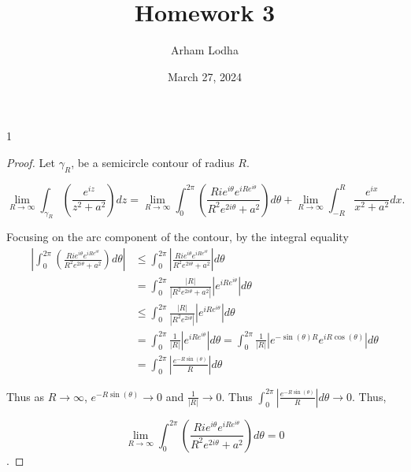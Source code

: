\documentclass{article}
\newcommand{\abs}[1]{\left\lvert #1\right\rvert}
\newcommand*{\lm}[1]{\lim_{#1 \to \infty}}
\begin{document}
\title{Homework 3}
\author{Arham Lodha}%
\date{March 27, 2024}%
\maketitle

\begin{PROB}{1}\label{Problem 1.}
\end{PROB}
\begin{proof}
    Let $\gamma_R$, be a semicircle contour of radius $R$. 
    
    \begin{equation}
        \lm{R} \int_{\gamma_R} \left(\frac{e^{iz}}{z^2 + a^2}\right) dz 
        = \lm{R} \int_{0}^{2 \pi} \left(\frac{Ri e^{i \theta} e^{i Re^{i \theta}}}{R^2 e^{2i \theta} + a^2}\right) d \theta + \lm{R} \int_{-R}^{R} \frac{e^{ix}}{x^2 + a^2} dx.
    \end{equation}

    Focusing on the arc component of the contour, by the integral equality
    \begin{align*}
        \abs{\int_{0}^{2 \pi} \left(\frac{Ri e^{i \theta} e^{i Re^{i \theta}}}{R^2 e^{2i \theta} + a^2}\right) d \theta} 
        &\leq \int_{0}^{2 \pi} \abs{\frac{Ri e^{i \theta} e^{i Re^{i \theta}}}{R^2 e^{2i \theta} + a^2}} d \theta \\
        &= \int_{0}^{2 \pi} \frac{\abs{R}}{\abs{R^2e^{2 i \theta} + a^2}} \abs{e^{i Re^{i \theta}}} d \theta \\
        &\leq \int_{0}^{2 \pi} \frac{\abs{R}}{\abs{R^2e^{2 i \theta}}} \abs{e^{i Re^{i \theta}}} d \theta \\
        &= \int_{0}^{2 \pi} \frac{1}{\abs{R}}\abs{e^{iRe^{i \theta}}} d \theta = \int_{0}^{2 \pi}\frac{1}{\abs{R}}\abs{e^{-\sin(\theta)R} e^{i R \cos(\theta)}} d \theta\\
        &= \int_{0}^{2 \pi} \abs{\frac{e^{-R \sin(\theta)}}{R}} d \theta
    \end{align*}

    Thus as $R \to \infty$, $e^{-R \sin(\theta)} \to 0$ and $\frac{1}{|R|} \to 0$. Thus $\int_{0}^{2 \pi} \abs{\frac{e^{-R \sin(\theta)}}{R}} d \theta \to 0$. Thus, 

    \begin{equation}
        \lm{R} \int_{0}^{2 \pi} \left(\frac{R i e^{i \theta} e^{i Re^{i \theta}}}{R^2 e^{2i \theta} + a^2}\right) d \theta = 0
    \end{equation}. 


\end{proof}
\end{document}
